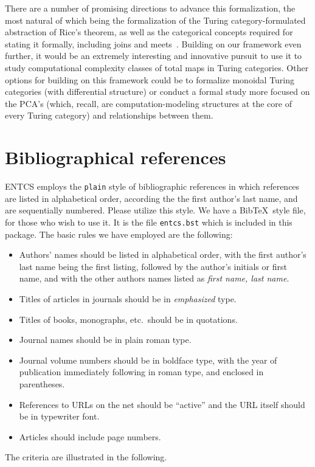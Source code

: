 \documentclass{entcs} \usepackage{entcsmacro}
\begin{document}
There are a number of promising directions to advance this formalization, the most natural of which being the formalization of the Turing category-formulated abstraction of Rice's theorem, as well as the categorical concepts required for stating it formally, including joins and meets~\cite{Latvia}. Building on our framework even further, it would be an extremely interesting and innovative pursuit to use it to study computational complexity classes of total maps in Turing categories. Other options for building on this framework could be to formalize monoidal Turing categories (with differential structure) or conduct a formal
study more focused on the PCA's (which, recall, are computation-modeling structures
at the core of every Turing category) and relationships between them. 


\section{Bibliographical references}\label{references}
ENTCS employs the \texttt{plain} style of bibliographic references in
which references are listed in alphabetical order, according the the
first author's last name, and are sequentially numbered. Please
utilize this style. We have a Bib\TeX\ style file, for those who wish
to use it. It is the file \texttt{entcs.bst} which is included in this
package. The basic rules we have employed are the following:
\begin{itemize}
\item Authors' names should be listed in alphabetical order, with the
  first author's last name being the first listing, followed by the
  author's initials or first name, and with the other authors names
  listed as \emph{first name, last name}.
\item Titles of articles in journals should be in \emph{emphasized}
  type.
\item Titles of books, monographs, etc.\ should be in quotations.
\item Journal names should be in plain roman type.
\item Journal volume numbers should be in boldface type, with the year
  of publication immediately following in roman type, and enclosed in
  parentheses.
\item References to URLs on the net should be ``active'' and the URL
  itself should be in typewriter font.
\item Articles should include page numbers.
\end{itemize}
The criteria are illustrated in the following.

\begin{thebibliography} %
	
	
	
	
\end{thebibliography}
\end{document}
